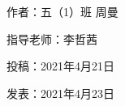 \vspace{10pt}



作者：五（1）班 周曼



指导老师：李哲茜



投稿：2021年4月21日



发表：2021年4月23日


















                



\vspace{10pt}

\hline



